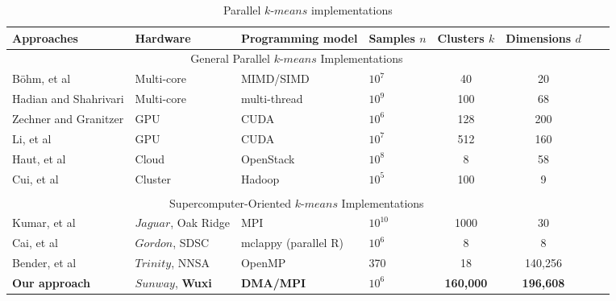 
\begin{table}

  \caption{Parallel $k$-$means$ implementations}
  \label{background}
  \begin{tabular}{p{2cm} p{2cm} p{3cm}p{2cm} c c c c}
   \toprule[1pt]
    Approaches&Hardware &Programming model &Samples $n$&Clusters $k$ & Dimensions $d$ \\
    \midrule
   \toprule
    \multicolumn{6}{c}{General Parallel $k$-$means$ Implementations}\\
    \hline
    B{\"o}hm, et al\cite{bohm2017multi} & Multi-core &MIMD/SIMD &$10^7$& 40& 20 \\
  
    \hline
     Hadian and Shahrivari \cite{hadian2014high}&Multi-core &multi-thread &$10^9$ &100&68 \\
     \hline
    Zechner and Granitzer \cite{zechner2009accelerating}&GPU&CUDA& $10^6$&128&200\\
    \hline
    Li, et al \cite{li2010speeding}&GPU&CUDA& $10^7$&512&160\\
      \hline
    Haut, et al \cite{haut2017cloud}& Cloud &OpenStack&$10^8$ &8 &58 \\
    \hline  
    Cui, et al \cite{cui2014optimized} &Cluster& Hadoop&$10^5$&100&9\\
 
    \\
    \midrule
    \toprule
    \multicolumn{6}{c}{Supercomputer-Oriented $k$-$means$ Implementations}\\
    \hline
    Kumar, et al \cite{kumar2011parallel}&$Jaguar$, Oak Ridge&MPI&$10^{10}$ &1000 &30\\
    \hline
    Cai, et al \cite{cai2015grouping}&$Gordon$, SDSC&mclappy (parallel R) &$10^6$&8&8\\
    \hline
    Bender, et al \cite{bender2015k}&$Trinity$, NNSA&OpenMP &370 &18&140,256\\
    \hline
    \textbf{Our approach} &\textbf{$Sunway$}, \textbf{Wuxi}&\textbf{DMA/MPI} &\textbf{$10^6$} &\textbf{160,000} &\textbf{196,608}\\
    \bottomrule
  \end{tabular}
  
\end{table}


